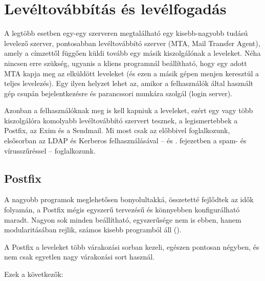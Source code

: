 \chapter{Levéltovábbítás és levélfogadás}\label{chap:Postfix}

A legtöbb esetben egy-egy szerveren megtalálható egy kisebb-nagyobb tudású levelező szerver, pontosabban levéltovábbító
szerver (MTA, Mail Transfer Agent), amely a címzettől függően küldi tovább egy másik kiszolgálónak a leveleket. Néha
nincsen erre szükség, ugyanis a kliens programnál beállítható, hogy egy adott MTA kapja meg az elküldött leveleket (és
ezen a másik gépen menjen keresztül a teljes levelezés). Egy ilyen helyzet lehet az, amikor a felhasználók által
használt gép csupán bejelentkezésre és parancssori munkára szolgál (login server).

Azonban a felhasználóknak meg is kell kapniuk a leveleket, ezért egy vagy több kiszolgálóra komolyabb levéltovábbító
szervert tesznek, a legismertebbek a Postfix, az Exim és a Sendmail. Mi most csak az előbbivel foglalkozunk, elsősorban az
LDAP és Kerberos felhasználásával -- és . fejezetben a spam- és vírusszűréssel -- foglalkozunk.

\section{Postfix}
A nagyobb programok meglehetősen bonyolultakká, összetetté fejlődtek az idők folyamán, a Postfix mégis egyszerű
tervezésű és könnyebben konfigurálható maradt. Nagyon sok minden beállítható, egyszerűsége nem is ebben, hanem
modularitásában rejlik, számos kisebb programból áll (\cite{szerverved}).

A Postfix a leveleket több várakozási sorban kezeli, egészen pontosan négyben, és nem csak egyetlen nagy várakozási sort
használ.

Ezek a következők:

